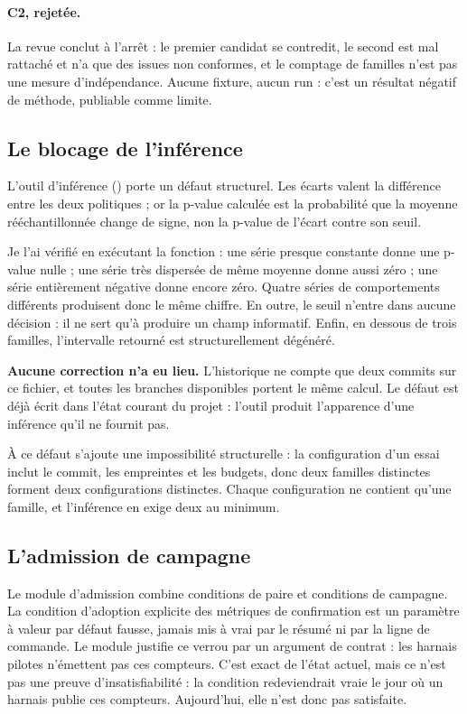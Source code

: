 \paragraph{C2, rejetée.} La revue conclut à l'arrêt : le premier candidat se
contredit, le second est mal rattaché et n'a que des issues non conformes, et le
comptage de familles n'est pas une mesure d'indépendance. Aucune fixture, aucun
run : c'est un résultat négatif de méthode, publiable comme limite.

\subsection{Le blocage de l'inférence}

L'outil d'inférence
() porte un défaut structurel. Les écarts valent
la différence entre les deux politiques ; or la p-value calculée est la
probabilité que la moyenne rééchantillonnée change de signe, non la p-value de
l'écart contre son seuil.

Je l'ai vérifié en exécutant la fonction : une série presque constante donne une
p-value nulle ; une série très dispersée de même moyenne donne aussi zéro ; une
série entièrement négative donne encore zéro. Quatre séries de comportements
différents produisent donc le même chiffre. En outre, le seuil n'entre dans
aucune décision : il ne sert qu'à produire un champ informatif. Enfin, en
dessous de trois familles, l'intervalle retourné est structurellement dégénéré.

\textbf{Aucune correction n'a eu lieu.} L'historique ne compte que deux commits
sur ce fichier, et toutes les branches disponibles portent le même calcul. Le
défaut est déjà écrit dans l'état courant du projet : l'outil produit
l'apparence d'une inférence qu'il ne fournit pas.

À ce défaut s'ajoute une impossibilité structurelle : la configuration d'un
essai inclut le commit, les empreintes et les budgets, donc deux familles
distinctes forment deux configurations distinctes. Chaque configuration ne
contient qu'une famille, et l'inférence en exige deux au minimum.

\subsection{L'admission de campagne}

Le module d'admission combine conditions de paire et conditions de campagne. La
condition d'adoption explicite des métriques de confirmation est un paramètre à
valeur par défaut fausse, jamais mis à vrai par le résumé ni par la ligne de
commande. Le module justifie ce verrou par un argument de contrat : les harnais
pilotes n'émettent pas ces compteurs. C'est exact de l'état actuel, mais ce n'est
pas une preuve d'insatisfiabilité : la condition redeviendrait vraie le jour où
un harnais publie ces compteurs. Aujourd'hui, elle n'est donc pas satisfaite.

